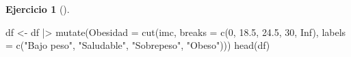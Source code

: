 \documentclass[
  a4paper,
]{scrreport}
\newenvironment{Shaded}{\begin{snugshade}}{\end{snugshade}}
\newcommand{\AttributeTok}[1]{\textcolor[rgb]{0.40,0.45,0.13}{#1}}
\newcommand{\ConstantTok}[1]{\textcolor[rgb]{0.56,0.35,0.01}{#1}}
\newcommand{\DecValTok}[1]{\textcolor[rgb]{0.68,0.00,0.00}{#1}}
\newcommand{\FloatTok}[1]{\textcolor[rgb]{0.68,0.00,0.00}{#1}}
\newcommand{\FunctionTok}[1]{\textcolor[rgb]{0.28,0.35,0.67}{#1}}
\newcommand{\NormalTok}[1]{\textcolor[rgb]{0.00,0.23,0.31}{#1}}
\newcommand{\OtherTok}[1]{\textcolor[rgb]{0.00,0.23,0.31}{#1}}
\newcommand{\SpecialCharTok}[1]{\textcolor[rgb]{0.37,0.37,0.37}{#1}}
\newcommand{\StringTok}[1]{\textcolor[rgb]{0.13,0.47,0.30}{#1}}
\theoremstyle{definition}
\newtheorem{exercise}{Ejercicio}[chapter]
\theoremstyle{remark}
\begin{document}
\begin{exercise}[]
\begin{enumerate}
\begin{tcolorbox}
\begin{Shaded}
\begin{Highlighting}[]
\NormalTok{df }\OtherTok{\textless{}{-}}\NormalTok{ df }\SpecialCharTok{|\textgreater{}}
    \FunctionTok{mutate}\NormalTok{(}\AttributeTok{Obesidad =} \FunctionTok{cut}\NormalTok{(imc, }\AttributeTok{breaks =} \FunctionTok{c}\NormalTok{(}\DecValTok{0}\NormalTok{, }\FloatTok{18.5}\NormalTok{, }\FloatTok{24.5}\NormalTok{, }\DecValTok{30}\NormalTok{, }\ConstantTok{Inf}\NormalTok{), }\AttributeTok{labels =} \FunctionTok{c}\NormalTok{(}\StringTok{"Bajo peso"}\NormalTok{, }\StringTok{"Saludable"}\NormalTok{, }\StringTok{"Sobrepeso"}\NormalTok{, }\StringTok{"Obeso"}\NormalTok{)))}
\FunctionTok{head}\NormalTok{(df)}
\end{Highlighting}
\end{Shaded}


\end{tcolorbox}
\end{enumerate}
\end{exercise}
\end{document}
